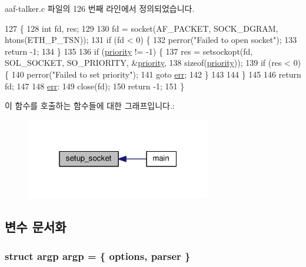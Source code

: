 aaf-\/talker.\+c 파일의 126 번째 라인에서 정의되었습니다.


\begin{DoxyCode}
127 \{
128     \textcolor{keywordtype}{int} fd, res;
129 
130     fd = socket(AF\_PACKET, SOCK\_DGRAM, htons(ETH\_P\_TSN));
131     \textcolor{keywordflow}{if} (fd < 0) \{
132         perror(\textcolor{stringliteral}{"Failed to open socket"});
133         \textcolor{keywordflow}{return} -1;
134     \}
135 
136     \textcolor{keywordflow}{if} (\hyperlink{aaf-talker_8c_acec9ce2df15222151ad66fcb1d74eb9f}{priority} != -1) \{
137         res = setsockopt(fd, SOL\_SOCKET, SO\_PRIORITY, &\hyperlink{aaf-talker_8c_acec9ce2df15222151ad66fcb1d74eb9f}{priority},
138                             \textcolor{keyword}{sizeof}(\hyperlink{aaf-talker_8c_acec9ce2df15222151ad66fcb1d74eb9f}{priority}));
139         \textcolor{keywordflow}{if} (res < 0) \{
140             perror(\textcolor{stringliteral}{"Failed to set priority"});
141             \textcolor{keywordflow}{goto} \hyperlink{gst__avb__playbin_8c_a6ce68847c12434f60d1b2654a3dc3409}{err};
142         \}
143 
144     \}
145 
146     \textcolor{keywordflow}{return} fd;
147 
148 \hyperlink{gst__avb__playbin_8c_a6ce68847c12434f60d1b2654a3dc3409}{err}:
149     close(fd);
150     \textcolor{keywordflow}{return} -1;
151 \}
\end{DoxyCode}


이 함수를 호출하는 함수들에 대한 그래프입니다.\+:
\nopagebreak
\begin{figure}[H]
\begin{center}
\leavevmode
\includegraphics[width=229pt]{aaf-talker_8c_aad31b1ae23d50a606d0b3cc45d346f4e_icgraph}
\end{center}
\end{figure}




\subsection{변수 문서화}
\subsubsection[{\texorpdfstring{argp}{argp}}]{\setlength{\rightskip}{0pt plus 5cm}struct argp argp = \{ {\bf options}, {\bf parser} \}\hspace{0.3cm}{\ttfamily [static]}}\hypertarget{aaf-talker_8c_ab70c96531b1b652d70c221cfaf3207f3}{}\label{aaf-talker_8c_ab70c96531b1b652d70c221cfaf3207f3}


